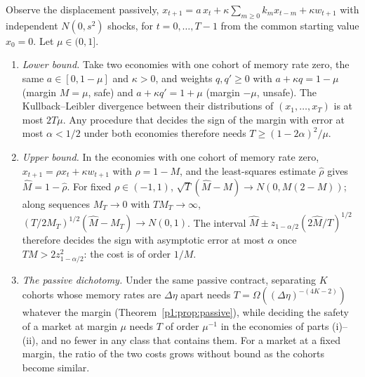 \begin{theorem}\label{thm:passivecert}
Observe the displacement passively, $x_{t+1}=a\,x_t+\kappa\sum_{m\ge0}k_mx_{t-m}+\kappa w_{t+1}$ with independent $N(0,s^2)$ shocks, for $t=0,\dots,T-1$ from the common starting value $x_0=0$. Let $\mu\in(0,1]$.
\begin{enumerate}[label=(\roman*)]
\item \emph{Lower bound.} Take two economies with one cohort of memory rate zero, the same $a\in[0,1-\mu]$ and $\kappa>0$, and weights $q,q'\ge0$ with $a+\kappa q=1-\mu$ (margin $M=\mu$, safe) and $a+\kappa q'=1+\mu$ (margin $-\mu$, unsafe). The Kullback--Leibler divergence between their distributions of $(x_1,\dots,x_T)$ is at most $2T\mu$. Any procedure that decides the sign of the margin with error at most $\alpha<1/2$ under both economies therefore needs $T\ge(1-2\alpha)^2/\mu$.
\item \emph{Upper bound.} In the economies with one cohort of memory rate zero, $x_{t+1}=\rho x_t+\kappa w_{t+1}$ with $\rho=1-M$, and the least-squares estimate $\hat\rho$ gives $\hat M=1-\hat\rho$. For fixed $\rho\in(-1,1)$, $\sqrt T(\hat M-M)\to N(0,M(2-M))$; along sequences $M_T\to0$ with $TM_T\to\infty$, $(T/2M_T)^{1/2}(\hat M-M_T)\to N(0,1)$. The interval $\hat M\pm z_{1-\alpha/2}(2\hat M/T)^{1/2}$ therefore decides the sign with asymptotic error at most $\alpha$ once $TM>2z_{1-\alpha/2}^2$: the cost is of order $1/M$.
\item \emph{The passive dichotomy.} Under the same passive contract, separating $K$ cohorts whose memory rates are $\Delta\eta$ apart needs $T=\Omega((\Delta\eta)^{-(4K-2)})$ whatever the margin (Theorem~\ref{p1:prop:passive}), while deciding the safety of a market at margin $\mu$ needs $T$ of order $\mu^{-1}$ in the economies of parts (i)--(ii), and no fewer in any class that contains them. For a market at a fixed margin, the ratio of the two costs grows without bound as the cohorts become similar.
\end{enumerate}
\hfill\Proved
\end{theorem}

